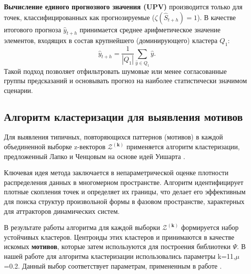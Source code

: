 \textbf{Вычисление единого прогнозного значения (UPV)} производится только для
 точек, классифицированных как прогнозируемые ($\zeta(\hat{S}_{t+h})=1$). В качестве итогового прогноза $\hat{y}_{t+h}$ принимается среднее арифметическое значение элементов, входящих в состав крупнейшего (доминирующего) кластера $Q_1$:
\[
\hat{y}_{t+h} = \frac{1}{|Q_1|} \sum_{\hat{y} \in Q_1} \hat{y}.
\]
Такой подход позволяет отфильтровать шумовые или менее согласованные группы
предсказаний и основывать прогноз на наиболее статистически значимом сценарии.

\subsection{Алгоритм кластеризации для выявления мотивов}

Для выявления типичных, повторяющихся паттернов (мотивов) в каждой
объединенной выборке z-векторов $\mathcal{Z}^{(\boldsymbol{k})}$ применяется
алгоритм кластеризации, предложенный Лапко и Ченцовым на основе идей
Уишарта \cite{LapkoChentsov2000}.

Ключевая идея метода заключается в непараметрической оценке плотности
распределения данных в многомерном пространстве. Алгоритм идентифицирует
плотные скопления точек и определяет их границы,
что делает его эффективным для поиска структур произвольной формы
в фазовом пространстве, характерных для аттракторов динамических систем.

В результате работы алгоритма для каждой выборки $\mathcal{Z}^{(\boldsymbol{k})}$
формируется набор устойчивых кластеров. Центроиды этих кластеров
и принимаются в качестве искомых \textbf{мотивов}, которые затем используются
для построения библиотеки $\Psi$.
В нашей работе для алгоритма кластеризации использовались параметры 
k=11,$\mu$=0.2. Данный выбор соответствует параметрам, примененным в работе \cite{GromovBaranov2023}.